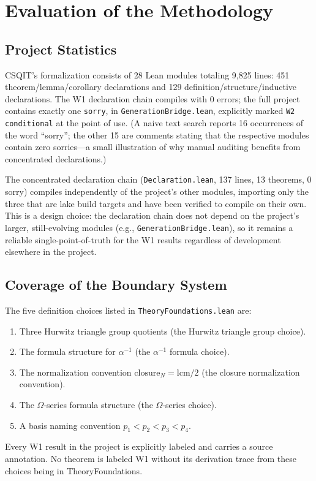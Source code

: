 ﻿\documentclass[11pt]{article}
\begin{document}
\section{Evaluation of the Methodology}
\label{sec:evaluation}

\subsection{Project Statistics}
CSQIT's formalization consists of 28 Lean modules totaling
9,825 lines: 451 theorem/lemma/corollary declarations and
129 definition/structure/inductive declarations. The W1
declaration chain compiles with 0 errors; the full project
contains exactly one \texttt{sorry}, in
\texttt{GenerationBridge.lean}, explicitly marked
\texttt{W2 conditional} at the point of use. (A naive text
search reports 16 occurrences of the word ``sorry''; the
other 15 are comments stating that the respective modules
contain zero sorries---a small illustration of why manual
auditing benefits from concentrated declarations.)

The concentrated declaration chain
(\texttt{Declaration.lean}, 137 lines, 13 theorems, 0 sorry)
compiles independently of the project's other modules,
importing only the three that are lake build targets and
have been verified to compile on their own. This is a
design choice: the declaration chain does not depend on
the project's larger, still-evolving modules (e.g.,
\texttt{GenerationBridge.lean}), so it remains a reliable
single-point-of-truth for the W1 results regardless of
development elsewhere in the project.

\subsection{Coverage of the Boundary System}
The five definition choices listed in
\texttt{TheoryFoundations.lean} are:
\begin{enumerate}
\item Three Hurwitz triangle group quotients (the Hurwitz triangle group choice).
\item The formula structure for $\alpha^{-1}$ (the $\alpha^{-1}$ formula choice).
\item The normalization convention $\mathrm{closure}_N = \mathrm{lcm}/2$
  (the closure normalization convention).
\item The $\Omega$-series formula structure (the $\Omega$-series choice).
\item A basis naming convention $p_1 < p_2 < p_3 < p_4$.
\end{enumerate}
Every W1 result in the project is explicitly labeled and
carries a source annotation. No theorem is labeled W1 without
its derivation trace from these choices being in TheoryFoundations.
\end{document}
